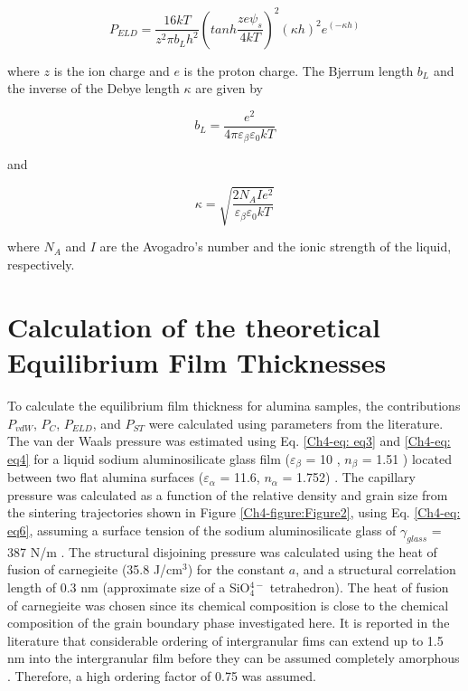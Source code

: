 \begin{equation}
\label{Ch4-eq: eq8}
P_{ELD} = \frac{16kT}{z^{2} \pi b_{L} h^{2}} \left( tanh \frac{ze \psi_{s}}{4kT} \right)^{2} (\kappa h)^{2} e^{(- \kappa h)}
\end{equation}
	
\noindent where $z$ is the ion charge and $e$ is the proton charge. The Bjerrum length $b_{L}$ and the inverse of the Debye length $\kappa$ are given by \cite{Clarke1993}
	
\begin{equation}
\label{Ch4-eq: eq9}
b_{L}= \frac{e^{2}}{4 \pi \varepsilon_{\beta} \varepsilon_{0} kT}
\end{equation}
	
\noindent and \cite{Israelachvili2011}
	
\begin{equation}
\label{Ch4-eq: eq10}
\kappa = \sqrt{\frac{2 N_{A} I e^{2}}{\varepsilon_{\beta} \varepsilon_{0} kT}}
\end{equation}

\noindent where $N_{A}$ and $I$ are the Avogadro's number and the ionic strength of the liquid, respectively.

\section{Calculation of the theoretical Equilibrium Film Thicknesses}
To calculate the equilibrium film thickness for alumina samples, the contributions $P_{vdW}$, $P_{C}$, $P_{ELD}$, and $P_{ST}$ were calculated using parameters from the literature. The van der Waals pressure was estimated using Eq. \ref{Ch4-eq: eq3} and \ref{Ch4-eq: eq4} for a liquid sodium aluminosilicate glass film ($\varepsilon_{\beta}$ = 10 \cite{Hsieh1996}, $n_{\beta}$ = 1.51 \cite{Day1962}) located between two flat alumina surfaces ($\varepsilon_{\alpha}$ = 11.6, $n_{\alpha}$ = 1.752) \cite{Clarke1987}. The capillary pressure was calculated as a function of the relative density and grain size from the sintering trajectories shown in Figure \ref{Ch4-figure:Figure2}, using Eq. \ref{Ch4-eq: eq6}, assuming a surface tension of the sodium aluminosilicate glass of $\gamma_{glass}$ = 387 N/m \cite{Lyon1942}. The structural disjoining pressure was calculated using the heat of fusion of carnegieite (35.8 J/cm$^{3}$) for the constant $a$, and a structural correlation length of 0.3 nm (approximate size of a SiO$_{4}^{4-}$ tetrahedron). The heat of fusion of carnegieite was chosen since its chemical composition is close to the chemical composition of the grain boundary phase investigated here. It is reported in the literature that considerable ordering of intergranular fims can extend up to 1.5 nm into the intergranular film before they can be assumed completely amorphous \cite{Zhang2005}. Therefore, a high ordering factor of 0.75 was assumed.

